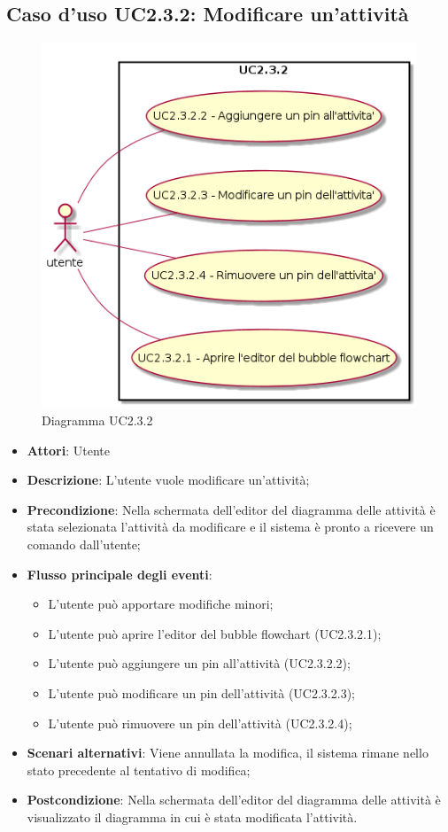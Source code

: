 \documentclass[../AnalisiDeiRequisiti.tex]{subfiles}
\begin{document}
				\subsection{Caso d'uso UC2.3.2: Modificare un'attività}
				\begin{figure} [H]
					\centering
					\includegraphics[scale=0.45]{./Figures/UC2.3.2.png}
					\caption{Diagramma UC2.3.2}\label{}
				\end{figure}
				\begin{itemize}
					\item \textbf{Attori}: Utente
					\item \textbf{Descrizione}: L'utente vuole modificare un'attività;
					\item \textbf{Precondizione}: Nella schermata dell'editor del diagramma delle attività è stata selezionata l'attività da modificare e il sistema è pronto a ricevere un comando dall'utente;
					\item \textbf{Flusso principale degli eventi}: \begin{itemize}
						\item L'utente può apportare modifiche minori;
						\item L'utente può aprire l'editor del bubble flowchart (UC2.3.2.1);
						\item L'utente può aggiungere un pin all'attività (UC2.3.2.2);
						\item L'utente può modificare un pin dell'attività (UC2.3.2.3);
						\item L'utente può rimuovere un pin dell'attività (UC2.3.2.4);
					\end{itemize}
					\item \textbf{Scenari alternativi}: Viene annullata la modifica, il sistema rimane nello stato precedente al tentativo di modifica;
					\item \textbf{Postcondizione}: Nella schermata dell'editor del diagramma delle attività è visualizzato il diagramma in cui è stata modificata l'attività.
				\end{itemize}
\end{document}
